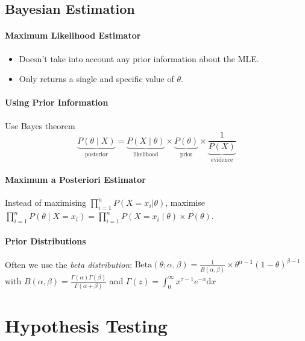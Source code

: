 \documentclass[twocolumn,english]{article}
\begin{document}
\subsection{Bayesian Estimation}

\paragraph{Maximum Likelihood Estimator}
\begin{itemize}
\item Doesn't take into account any prior information about the MLE.
\item Only returns a single and specific value of $\theta$.
\end{itemize}

\paragraph{Using Prior Information}

Use Bayes theorem
\[
\underbrace{P\left(\theta\mid X\right)}_{\text{posterior}}=\underbrace{P\left(X\mid\theta\right)}_{\text{likelihood}}\times\underbrace{P\left(\theta\right)}_{\text{prior}}\times\underbrace{\frac{1}{P\left(X\right)}}_{\text{evidence}}
\]

\paragraph{Maximum a Posteriori Estimator}

Instead of maximising $\prod_{i=1}^{n}P\left(X=x_{i}|\theta\right)$,
maximise $\prod_{i=1}^{n}P\left(\theta\mid X=x_{i}\right)=\prod_{i=1}^{n}P\left(X=x_{i}\mid\theta\right)\times P\left(\theta\right)$.

\paragraph{Prior Distributions}

Often we use the \emph{beta distribution}: $\text{Beta}\left(\theta;\alpha,\beta\right)=\frac{1}{B\left(\alpha,\beta\right)}\times\theta^{\alpha-1}\left(1-\theta\right)^{\beta-1}$
with $B\left(\alpha,\beta\right)=\frac{\Gamma\left(\alpha\right)\Gamma\left(\beta\right)}{\Gamma\left(\alpha+\beta\right)}$
and $\Gamma\left(z\right)=\int_{0}^{\infty}x^{z-1}e^{-x}\text{d}x$

\section{Hypothesis Testing}
\end{document}
